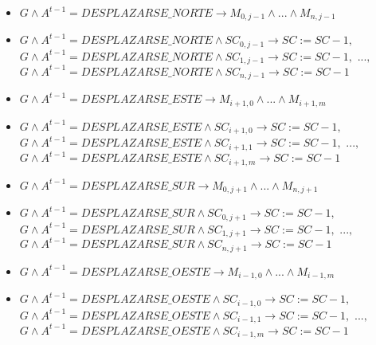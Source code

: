 \begin{itemize}
    \item $G \land A^{t-1} = DESPLAZARSE\_NORTE \longrightarrow M_{0, j-1} \land ... \land M_{n, j-1}$
    \item $G \land A^{t-1} = DESPLAZARSE\_NORTE \land SC_{0, j-1} \longrightarrow SC := SC - 1,$ \newline
    $G \land A^{t-1} = DESPLAZARSE\_NORTE \land SC_{1, j-1} \longrightarrow SC := SC - 1,$ \newline
    $...,$ \newline
    $G \land A^{t-1} = DESPLAZARSE\_NORTE \land SC_{n, j-1} \longrightarrow SC := SC - 1$
    \item $G \land A^{t-1} = DESPLAZARSE\_ESTE \longrightarrow M_{i+1, 0} \land ... \land M_{i+1, m}$
    \item $G \land A^{t-1} = DESPLAZARSE\_ESTE \land SC_{i+1, 0} \longrightarrow SC := SC - 1,$ \newline
    $G \land A^{t-1} = DESPLAZARSE\_ESTE \land SC_{i+1, 1} \longrightarrow SC := SC - 1,$ \newline
    $...,$ \newline
    $G \land A^{t-1} = DESPLAZARSE\_ESTE \land SC_{i+1,m} \longrightarrow SC := SC - 1$
    \item $G \land A^{t-1} = DESPLAZARSE\_SUR \longrightarrow M_{0, j+1} \land ... \land M_{n, j+1}$
    \item $G \land A^{t-1} = DESPLAZARSE\_SUR \land SC_{0, j+1} \longrightarrow SC := SC - 1,$ \newline
    $G \land A^{t-1} = DESPLAZARSE\_SUR \land SC_{1, j+1} \longrightarrow SC := SC - 1,$ \newline
    $...,$ \newline
    $G \land A^{t-1} = DESPLAZARSE\_SUR \land SC_{n, j+1} \longrightarrow SC := SC - 1$
    \item $G \land A^{t-1} = DESPLAZARSE\_OESTE \longrightarrow M_{i-1, 0} \land ... \land M_{i-1, m}$
    \item $G \land A^{t-1} = DESPLAZARSE\_OESTE \land SC_{i-1, 0} \longrightarrow SC := SC - 1,$ \newline
    $G \land A^{t-1} = DESPLAZARSE\_OESTE \land SC_{i-1, 1} \longrightarrow SC := SC - 1,$ \newline
    $...,$ \newline
    $G \land A^{t-1} = DESPLAZARSE\_OESTE \land SC_{i-1,m} \longrightarrow SC := SC - 1$
\end{itemize}

